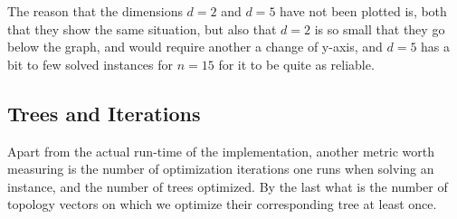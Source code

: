 The reason that the dimensions $d=2$ and $d=5$ have not been plotted is, both
that they show the same situation, but also that $d=2$ is so small that they go
below the graph, and would require another a change of y-axis, and $d=5$ has a
bit to few solved instances for $n=15$ for it to be quite as reliable.

\subsection{Trees and Iterations}
\label{sec:trees-iterations}

Apart from the actual run-time of the implementation, another metric worth
measuring is the number of optimization iterations one runs when solving an
instance, and the number of trees optimized. By the last what is the number of
topology vectors on which we optimize their corresponding tree at least once.
%
